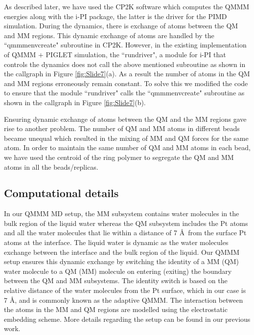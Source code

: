 As described later, we have used the CP2K software which computes the QMMM
energies along with the i-PI package\cite{kapil2019pi}, the latter is the driver
for the PIMD simulation. During the dynamics, there is exchange of atoms
between the QM and MM regions. This dynamic exchange of atoms are handled
by the ``qmmm\textunderscore env\textunderscore create" subroutine in CP2K.
However, in the existing implementation of QMMM $+$ PIGLET simulation, the ``run\textunderscore driver", a module for i-PI that controls the dynamics does not
call the above mentioned subroutine as shown in the callgraph
in Figure \ref{fig:Slide7}(a). As a result the number of atoms in the QM and MM
regions erroneously remain constant. To solve this we modified
the code to ensure that the module ``run\textunderscore driver" calls the 
``qmmm\textunderscore env\textunderscore create" subroutine as shown in the
callgraph in Figure \ref{fig:Slide7}(b).


Ensuring dynamic exchange of atoms between the QM and the MM regions gave rise to
another problem. The number of QM and MM atoms in different beads became unequal
which resulted in the mixing of MM and QM forces for the same atom. In order to maintain the same number of QM and MM atoms in each bead, we have used the
centroid of the ring polymer to segregate the QM and MM atoms in all the 
beads/replicas.  

\subsection{Computational details}
In our QMMM MD setup, the MM subsystem contains water molecules in the bulk region of the liquid water whereas the QM subsystem includes the Pt atoms and all the water 
molecules that lie within a distance of 7 \AA~from the surface Pt atoms at the
interface.
The liquid water is dynamic as the 
water molecules exchange between the interface and the bulk region of the 
liquid\cite{sakong2020water}. Our QMMM setup ensures this dynamic exchange by 
switching the identity of a MM (QM) water molecule to a QM (MM) molecule on entering 
(exiting) the boundary between the QM and MM subsystems. The identity switch is based 
on the relative distance of the water molecules from the Pt surface, which in
our case is 7 \AA, and is commonly 
known as the adaptive QMMM\cite{bernstein2012qm}. The interaction between the atoms in the MM and QM regions are modelled using the electrostatic embedding scheme\cite{laino2006efficient}. More details regarding the setup can be found in our previous work\cite{hardikar2019theoretical}.


